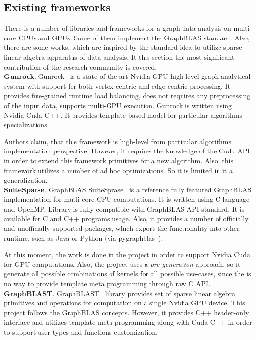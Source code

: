 \subsection{Existing frameworks}

There is a number of libraries and frameworks for a graph data analysis on multi-core CPUs and GPUs. Some of them implement the GraphBLAS standard. Also, there are some works, which are inspired by the standard idea to utilize sparse linear algebra apparatus of data analysis. It this section the most significant contribution of the research community is covered.\\

\textbf{Gunrock}. Gunrock~\cite{article:gunrock} is a state-of-the-art Nvidia GPU high level graph analytical system with support for both vertex-centric and edge-centric processing. It provides fine-grained runtime load balancing, does not requires any preprocessing of the input data, supports multi-GPU execution. Gunrock is written using Nvidia Cuda C++. It provides template based model for particular algorithms specializations. 

Authors claim, that this framework is high-level from particular algorithms implementation perspective. However, it requires the knowledge of the Cuda API in order to extend this framework primitives for a new algorithm. Also, this framework utilizes a number of ad hoc optimizations. So it is limited in it a generalization.\\

\textbf{SuiteSparse}. GraphBLAS SuiteSprase~\cite{article:suite_sparse_for_graph_problems} is a reference fully featured GraphBLAS implementation for mutli-core CPU computations. It is written using C language and OpenMP. Library is fully compatible with GraphBLAS API standard. It is available for C and C++ programs usage. Also, it provides a number of officially and unofficially supported packages, which export the functionality into other runtime, such as Java or Python (via pygraphblas~\cite{net:pygraphblas}).

At this moment, the work is done in the project in order to support Nvidia Cuda for GPU computations. Also, the project uses a \textit{pre-generation} approach, so it generate all possible combinations of kernels for all possible use-cases, since the is no way to provide template meta programming through raw C API.\\

\textbf{GraphBLAST}. GraphBLAST~\cite{yang2019graphblast} library provides set of sparse linear algebra primitives and operations for computation on a single Nvidia GPU device. This project follows the GraphBLAS concepts. However, it provides C++ header-only interface and utilizes template meta programming along with Cuda C++ in order to support user types and functions customization. 

